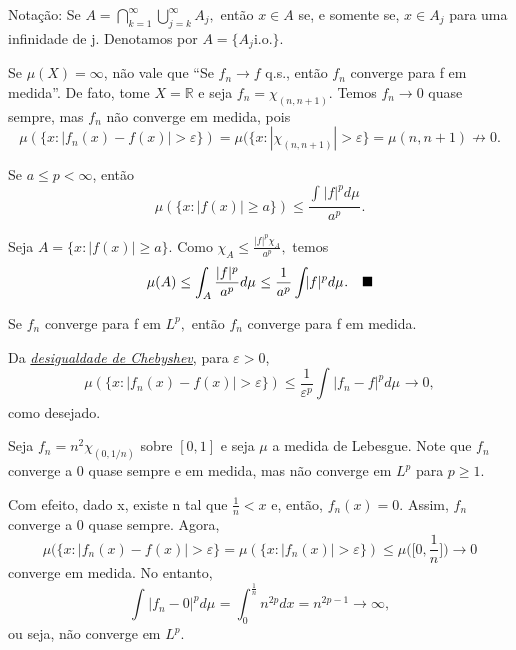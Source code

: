 \documentclass[measure_theory.tex]{subfiles}
\begin{document}
Notação: Se \(A = \bigcap_{k=1}^{\infty}\bigcup_{j=k}^{\infty}A_{j},\) então \(x\in A\) se, e somente se, \(x\in A_{j}\) para uma infinidade de j. Denotamos por \(A = \{A_{j}\mathrm{i.o.}\}.\)
\begin{example}
	Se \(\mu (X) = \infty\), não vale que ``Se \(f_{n}\to f\) q.s., então \(f_{n}\) converge para f em medida''. De fato, tome \(X = \mathbb{R}\) e seja \(f_{n} = \chi_{(n, n+1)}.\) Temos \(f_{n}\to 0\) quase sempre, mas \(f_{n}\) não converge em medida, pois
	\[
		\mu (\{x: |f_{n}(x) - f(x)|> \varepsilon \}) = \mu (\{x: |\chi_{(n, n+1)}| > \varepsilon \} = \mu (n, n+1)\not\to 0.
	\]
\end{example}
\hypertarget{chebyshev}{
	\begin{lemma*}[Chebyshev]
		Se \(a\leq p < \infty\), então
		\[
			\mu (\{x: |f(x)| \geq a\}) \leq \frac{\int_{}|f|^{p} d\mu_{}}{a^{p}}.
		\]
	\end{lemma*}}
\begin{proof*}
	Seja \(A = \{x: |f(x)| \geq a\}.\) Como \(\chi_{A} \leq \frac{|f|^{p}\chi_{A}}{a^{p}},\) temos
	\[
		\mu (A) \leq \int_{A}\frac{|f|^{p}}{a^{p}} d\mu_{} \leq \frac{1}{a^{p}}\int_{}|f|^{p} d\mu_{}. \quad \text{$\blacksquare$}
	\]
\end{proof*}
\begin{prop*}
	Se \(f_{n}\) converge para f em \(L^{p},\) então \(f_{n}\) converge para f em medida.
\end{prop*}
\begin{proof*}
	Da \hyperlink{chebyshev}{\textit{desigualdade de Chebyshev}}, para \(\varepsilon >0\),
	\[
		\mu (\{x: |f_{n}(x) - f(x)| > \varepsilon \}) \leq \frac{1}{\varepsilon ^{p}}\int_{}|f_{n}-f|^{p} d\mu_{}\to 0,
	\]
	como desejado. \qedsymbol
\end{proof*}
\begin{example}
	Seja \(f_{n} = n^{2}\chi_{(0, 1/n)}\) sobre \([0, 1]\) e seja \(\mu \) a medida de Lebesgue. Note que \(f_{n}\) converge a 0 quase sempre e em medida, mas não converge em \(L^{p}\) para \(p \geq 1\).

	Com efeito, dado x, existe n tal que \(\frac{1}{n} < x\) e, então, \(f_{n}(x) = 0.\) Assim, \(f_{n}\) converge a 0 quase sempre. Agora,
	\[
		\mu (\{x: |f_{n}(x) - f(x)| > \varepsilon \} = \mu (\{x: |f_{n}(x)| > \varepsilon \}) \leq \mu \biggl(\biggl[0, \frac{1}{n}\biggr]\biggr)\to 0
	\]
	converge em medida. No entanto,
	\[
		\int_{}|f_{n}-0|^{p} d\mu_{} = \int_{0}^{\frac{1}{n}}n^{2p}dx = n^{2p-1}\to \infty,
	\]
	ou seja, não converge em \(L^{p}.\)
\end{example}
\end{document}
